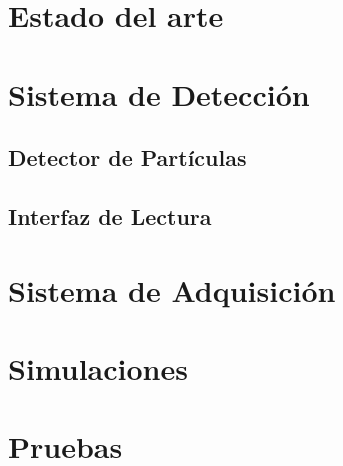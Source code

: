 \documentclass[11pt,letterpaper,oneside]{phstylee}
\begin{document}
\newpage
\thispagestyle{empty}
\cleardoublepage

%
%

\chapter{Estado del arte}
\label{cap:art}


\newpage
\thispagestyle{empty}
\cleardoublepage

\newpage
\thispagestyle{empty}
\cleardoublepage

\chapter{Sistema de Detección}
\label{cap:sdet}

\section{Detector de Partículas}
\label{sec:stgc}


\section{Interfaz de Lectura}
\label{sec:asd}


\newpage
\thispagestyle{empty}
\cleardoublepage

\chapter{Sistema de Adquisición}
\label{cap:sadq}


\newpage
\thispagestyle{empty}
\cleardoublepage

\chapter{Simulaciones}
\label{cap:sim}


\newpage
\thispagestyle{empty}
\cleardoublepage

\chapter{Pruebas}
\label{cap:test}

\end{document}
